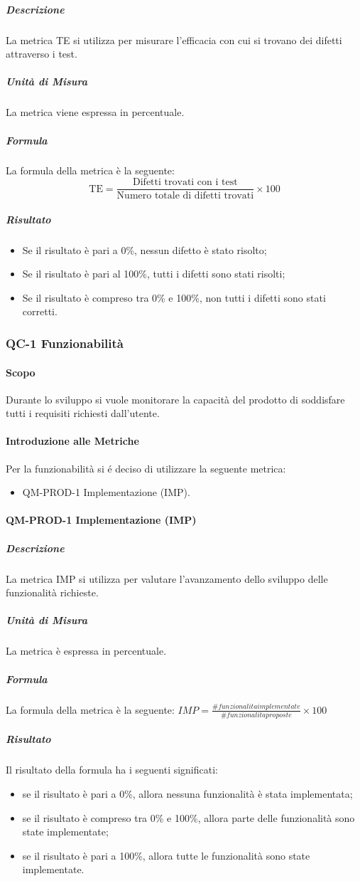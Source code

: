 				\subparagraph{Descrizione}
				La metrica TE si utilizza per misurare l'efficacia con cui si trovano dei difetti attraverso i test.

				\subparagraph{Unità di Misura}
				La metrica viene espressa in percentuale.

				\subparagraph{Formula}
				La formula della metrica è la seguente:
				\[
					\text{TE} = \frac{\text{Difetti trovati con i test}}{\text{Numero totale di difetti trovati}} \times 100
				\]

				\subparagraph{Risultato}
				\begin{itemize}
					\item Se il risultato è pari a 0\%, nessun difetto è stato risolto;
					\item Se il risultato è pari al 100\%, tutti i difetti sono stati risolti;
					\item Se il risultato è compreso tra 0\% e 100\%, non tutti i difetti sono stati corretti.
				\end{itemize}

		\subsubsection{QC-1 Funzionabilità}
			\paragraph{Scopo}
				Durante lo sviluppo si vuole monitorare la capacità del prodotto di soddisfare tutti i requisiti richiesti dall'utente.
			\paragraph{Introduzione alle Metriche}
				Per la funzionabilità si é deciso di utilizzare la seguente metrica:
				\begin{itemize}
					\item QM-PROD-1 Implementazione (IMP).
				\end{itemize}
			\paragraph{QM-PROD-1 Implementazione (IMP)}
				\subparagraph{Descrizione}
					La metrica IMP si utilizza per valutare l'avanzamento dello sviluppo delle funzionalità richieste.
				\subparagraph{Unità di Misura}
					La metrica è espressa in percentuale.
				\subparagraph{Formula}
					La formula della metrica è la seguente:
					\(
						IMP = \frac{\# funzionalita implementate}{\# funzionalita proposte}\times100
					\)
				\subparagraph{Risultato}
					Il risultato della formula ha i seguenti significati:
					\begin{itemize}
						\item se il risultato è pari a 0\%, allora nessuna funzionalità è stata implementata;
						\item se il risultato è compreso tra 0\% e 100\%, allora parte delle funzionalità sono state implementate;
						\item se il risultato è pari a 100\%, allora tutte le funzionalità sono state implementate.
					\end{itemize}

